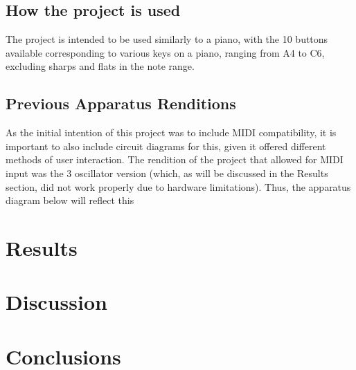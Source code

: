 \documentclass[10pt]{article}
\begin{document}
\subsection{How the project is used}\label{How the project is used}

The project is intended to be used similarly to a piano, with the 10 buttons available corresponding to various keys on a piano, ranging from A4 to C6, excluding sharps and flats in the note range. 

\subsection{Previous Apparatus Renditions}\label{Previous Apparatus Renditions}

As the initial intention of this project was to include MIDI compatibility, it is important to also include circuit diagrams for this, given it offered different methods of user interaction. The rendition of the project that allowed for MIDI input was the 3 oscillator version (which, as will be discussed in the Results section, did not work properly due to hardware limitations). Thus, the apparatus diagram below will reflect this 


\section{Results}\label{Results}






\section{Discussion}\label{Discussion}



\section{Conclusions}
\end{document}
